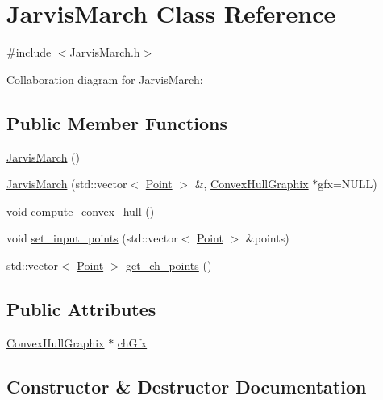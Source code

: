 \hypertarget{class_jarvis_march}{}\section{Jarvis\+March Class Reference}
\label{class_jarvis_march}


{\ttfamily \#include $<$Jarvis\+March.\+h$>$}



Collaboration diagram for Jarvis\+March\+:
\subsection*{Public Member Functions}
\begin{DoxyCompactItemize}
\item 
\mbox{\hyperlink{class_jarvis_march_a077887259741d7c57e1f64ea9ce7b324}{Jarvis\+March}} ()
\item 
\mbox{\hyperlink{class_jarvis_march_a0f28b67cdc8868e9ccb84bbcc3ef340f}{Jarvis\+March}} (std\+::vector$<$ \mbox{\hyperlink{class_point}{Point}} $>$ \&, \mbox{\hyperlink{class_convex_hull_graphix}{Convex\+Hull\+Graphix}} $\ast$gfx=N\+U\+LL)
\item 
void \mbox{\hyperlink{class_jarvis_march_a5617c3acf6ab1f5ad7988e0c856740c3}{compute\+\_\+convex\+\_\+hull}} ()
\item 
void \mbox{\hyperlink{class_jarvis_march_a53ff2d27872fa533efb2ce222a9dde88}{set\+\_\+input\+\_\+points}} (std\+::vector$<$ \mbox{\hyperlink{class_point}{Point}} $>$ \&points)
\item 
std\+::vector$<$ \mbox{\hyperlink{class_point}{Point}} $>$ \mbox{\hyperlink{class_jarvis_march_ae07fa1d85d5be1e876baa79a0a15e6bf}{get\+\_\+ch\+\_\+points}} ()
\end{DoxyCompactItemize}
\subsection*{Public Attributes}
\begin{DoxyCompactItemize}
\item 
\mbox{\hyperlink{class_convex_hull_graphix}{Convex\+Hull\+Graphix}} $\ast$ \mbox{\hyperlink{class_jarvis_march_a6fb3af00dde6115578e1accc2e8b953c}{ch\+Gfx}}
\end{DoxyCompactItemize}


\subsection{Constructor \& Destructor Documentation}
\mbox{\label{class_jarvis_march_a077887259741d7c57e1f64ea9ce7b324}} 

